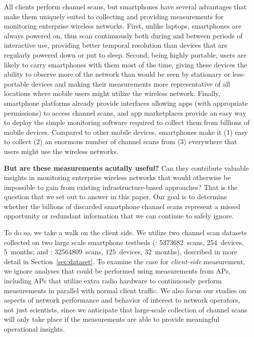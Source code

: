 All \wifi{} clients perform channel scans, but smartphones have several
advantages that make them uniquely suited to collecting and providing
measurements for monitoring enterprise wireless networks. First, unlike laptops,
smartphones are always powered on, thus scan continuously both during and
between periods of interactive use, providing better temporal resolution than
devices that are regularly powered down or put to sleep. Second, being highly portable, users
are likely to carry smartphones with them most of the time, giving these devices
the ability to observe more of the network than would be seen by stationary or
less-portable devices and making their measurements more representative of all
locations where mobile users might utilize the wireless network. Finally,
smartphone platforms already provide interfaces allowing apps (with appropriate
permissions) to access channel scans, and app marketplaces provide an easy way
to deploy the simple monitoring software required to collect them from billions of
mobile devices. Compared to other mobile devices, smartphones make it (1) easy
to collect (2) an enormous number of channel scans from (3) everywhere that
users might use the wireless networks.

\textbf{But are these measurements acutally useful?} Can they contribute
valuable insights in monitoring enterprise wireless networks that would
otherwise be impossible to gain from existing infrastructure-based approaches?
That is the question that we set out to answer in this paper. Our goal is to
determine whether the billions of discarded smartphone channel scans represent a
missed opportunity or redundant information that we can continue to safely
ignore.

To do so, we take a walk on the client side. We utilize two \wifi{} channel scan
datasets collected on two large scale smartphone testbeds (\PhoneLab{}:
\num{5373682}~scans, 254~devices, 5~months; and \NetSense{}:
\num{32564809}~scans, 125~devices, 32~months), described in more detail in
Section~\ref{sec:dataset}. To examine the case for \textit{client-side}
measurement, we ignore analyses that could be performed using measurements from
APs, including APs that utilize extra radio hardware to
continuously perform measurements in parallel with normal client traffic. We
also focus our studies on aspects of network performance and behavior of
interest to network operators, not just scientists, since we anticipate that
large-scale collection of channel scans will only take place if the measurements
are able to provide meaningful operational insights.

